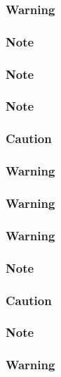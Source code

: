 \subsubsection{Warning}

\subsubsection{Note}

\subsubsection{Note}

\subsubsection{Note}

\subsubsection{Caution}

\subsubsection{Warning}

\subsubsection{Warning}

\subsubsection{Warning}

\subsubsection{Note}

\subsubsection{Caution}

\subsubsection{Note}

\subsubsection{Warning}

